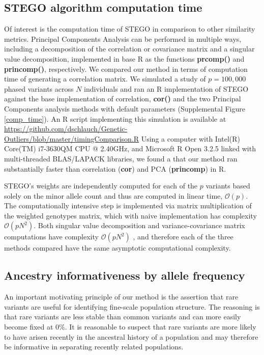 \subsection{STEGO algorithm computation time}

Of interest is the computation time of STEGO in comparison to other
similarity metrics. Principal Components Analysis can be performed
in multiple ways, including a decomposition of the correlation or
covariance matrix and a singular value decomposition, implemented
in base R as the functions \textbf{prcomp()} and \textbf{princomp()},
respectively. We compared our method in terms of computation time
of generating a correlation matrix. We simulated a study of $p=100,000$
phased variants across $N$ individuals and ran an R implementation
of STEGO against the base implementation of correlation, \textbf{cor()}
and the two Principal Components analysis methods with default parameters
(Supplemental Figure \ref{comp_time}). An R script implementing this
simulation is available at \url{https://github.com/dschlauch/Genetic-Outliers/blob/master/timingComparison.R}
Using a computer with Intel(R) Core(TM) i7-3630QM CPU @ 2.40GHz, and
Microsoft R Open 3.2.5 linked with multi-threaded BLAS/LAPACK libraries,
we found a that our method ran substantially faster than correlation
(\textbf{cor}) and PCA (\textbf{princomp}) in R. 

STEGO's weights are independently computed for each of the $p$ variants
based solely on the minor allele count and thus are computed in linear
time, $\mathcal{O}(p)$. The computationally intensive step is implemented
via matrix multiplication of the weighted genotypes matrix, which
with naive implementation has complexity $\mathcal{O}(pN^{2})$. Both
singular value decomposition and variance-covariance matrix computations
have complexity $\mathcal{O}(pN^{2})$ \cite{holmes2007fast}, and
therefore each of the three methods compared have the same asymptotic
computational complexity.

\subsection{Ancestry informativeness by allele frequency}

An important motivating principle of our method is the assertion that
rare variants are useful for identifying fine-scale population structure.
The reasoning is that rare variants are less stable than common variants
and can more easily become fixed at 0\%. It is reasonable to suspect
that rare variants are more likely to have arisen recently in the
ancestral history of a population and may therefore be informative
in separating recently related populations.

